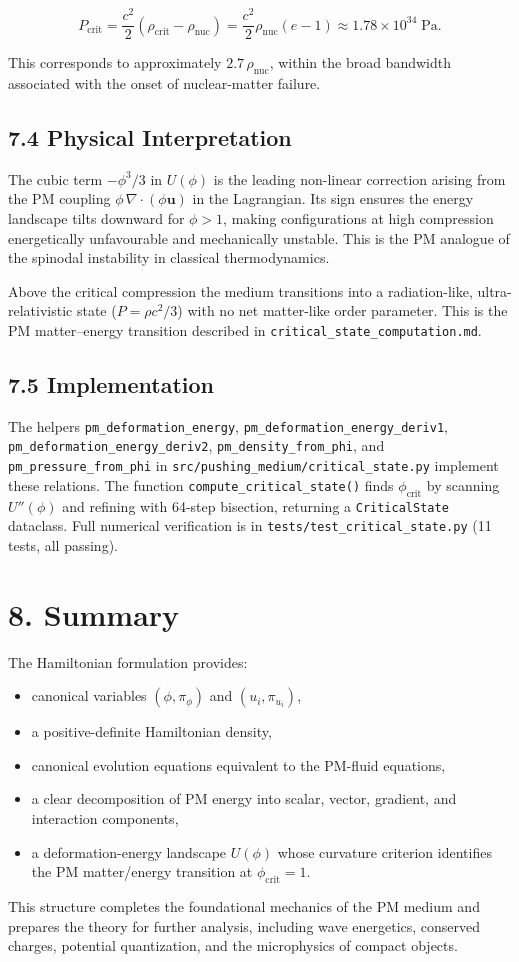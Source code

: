 \documentclass{article}
\begin{document}
\[
P_{\mathrm{crit}}
= \frac{c^2}{2}(\rho_{\mathrm{crit}} - \rho_{\mathrm{nuc}})
= \frac{c^2}{2}\rho_{\mathrm{nuc}}(e-1)
\approx 1.78\times10^{34}\;\mathrm{Pa}.
\]


This corresponds to approximately $2.7\,\rho_{\mathrm{nuc}}$, within the broad
bandwidth associated with the onset of nuclear-matter failure.

\subsection*{7.4 Physical Interpretation}

The cubic term $-\phi^3/3$ in $U(\phi)$ is the leading non-linear correction
arising from the PM coupling $\phi\,\nabla\cdot(\phi\mathbf u)$ in the
Lagrangian.  Its sign ensures the energy landscape tilts downward for
$\phi > 1$, making configurations at high compression energetically
unfavourable and mechanically unstable.  This is the PM analogue of the
spinodal instability in classical thermodynamics.

Above the critical compression the medium transitions into a radiation-like,
ultra-relativistic state ($P = \rho c^2/3$) with no net matter-like order
parameter.  This is the PM matter--energy transition described in
\texttt{critical\_state\_computation.md}.

\subsection*{7.5 Implementation}

The helpers \texttt{pm\_deformation\_energy}, \texttt{pm\_deformation\_energy\_deriv1},
\texttt{pm\_deformation\_energy\_deriv2}, \texttt{pm\_density\_from\_phi}, and
\texttt{pm\_pressure\_from\_phi} in
\texttt{src/pushing\_medium/critical\_state.py} implement these relations.
The function \texttt{compute\_critical\_state()} finds $\phi_{\mathrm{crit}}$
by scanning $U''(\phi)$ and refining with 64-step bisection, returning a
\texttt{CriticalState} dataclass.  Full numerical verification is in
\texttt{tests/test\_critical\_state.py} (11 tests, all passing).

\section*{8. Summary}

The Hamiltonian formulation provides:

\begin{itemize}
    \item canonical variables $(\phi, \pi_\phi)$ and $(u_i, \pi_{u_i})$,
    \item a positive-definite Hamiltonian density,
    \item canonical evolution equations equivalent to the PM-fluid equations,
    \item a clear decomposition of PM energy into scalar, vector, gradient, and interaction components,
    \item a deformation-energy landscape $U(\phi)$ whose curvature criterion identifies the PM matter/energy transition at $\phi_{\mathrm{crit}} = 1$.
\end{itemize}

This structure completes the foundational mechanics of the PM medium and
prepares the theory for further analysis, including wave energetics, conserved
charges, potential quantization, and the microphysics of compact objects.
\end{document}
